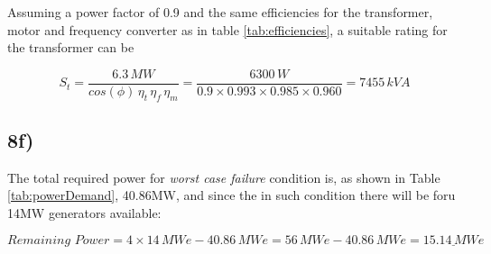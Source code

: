 Assuming a power factor of 0.9 and the same efficiencies for the transformer, motor and frequency converter as in table \ref{tab:efficiencies}, a suitable rating for the transformer can be


\[
S_{t}=\frac{6.3\,MW}{cos(\phi)\,\eta_t\,\eta_f\,\eta_m}=\frac{6300\,W}{0.9 \times 0.993 \times 0.985 \times 0.960}=7455 \, kV\!A
\]


\subsection*{8f)}


The total required power for \textit{worst case failure} condition is, as shown in Table \ref{tab:powerDemand}, 40.86MW, and since the in such condition there will be foru 14MW generators available: 

\[
Remaining\,\,Power=4 \times 14\,MWe - 40.86\,MWe = 56\,MWe - 40.86\,MWe = \underline{15.14 \, MWe}
\]
